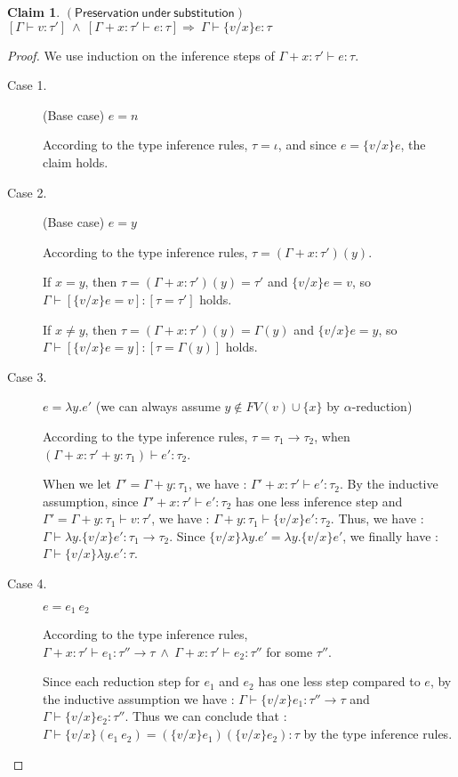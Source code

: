 \documentclass{article}
\newtheorem{clm}{Claim}[section]
\begin{document}
\begin{clm}$\mathsf{(Preservation \: under \: substitution)}$
$[\Gamma \vdash v : \tau'] \:\wedge\: [\Gamma + x : \tau' \vdash e : \tau] \Rightarrow\: \Gamma \vdash \{v/x\}e : \tau$
\end{clm}
\begin{proof}
We use induction on the inference steps of $\Gamma + x : \tau' \vdash e : \tau$.
\begin{description}

\item[Case 1.] (Base case) $e=n$

According to the type inference rules, $\tau = \iota$, and since $e=\{v/x\}e$, the claim holds.

\item[Case 2.] (Base case) $e=y$

According to the type inference rules, $\tau = (\Gamma + x : \tau')(y)$.

If $x=y$, then $\tau=(\Gamma + x : \tau')(y)=\tau'$ and $\{v/x\}e = v$, so $\Gamma \vdash [\{v/x\}e = v] : [\tau=\tau']$ holds. 

If $x \neq y$, then $\tau = (\Gamma + x : \tau')(y) = \Gamma(y)$ and $\{v/x\}e = y$, so $\Gamma \vdash [\{v/x\}e = y] : [\tau = \Gamma(y)]$ holds.

\item[Case 3.] $e = \lambda y.e'$ (we can always assume $y \notin FV(v) \cup \{x\}$ by $\alpha$-reduction)

According to the type inference rules, $\tau = \tau_1 \rightarrow \tau_2$, when $(\Gamma + x : \tau' + y : \tau_1) \vdash e' : \tau_2$.

When we let $\Gamma' = \Gamma + y : \tau_1$, we have : $\Gamma' + x : \tau' \vdash e' : \tau_2$. By the inductive assumption, since $\Gamma' + x : \tau' \vdash e' : \tau_2$ has one less inference step and $\Gamma' = \Gamma + y : \tau_1 \vdash v : \tau'$, we have : $\Gamma + y : \tau_1 \vdash \{v/x\}e' : \tau_2$. Thus, we have : $\Gamma \vdash \lambda y.\{v/x\}e' : \tau_1 \rightarrow \tau_2$. Since $\{v/x\}\lambda y.e' = \lambda y.\{v/x\}e'$, we finally have : $\Gamma \vdash \{v/x\}\lambda y.e' : \tau$.

\item[Case 4.] $e = e_1 \: e_2$

According to the type inference rules, $\Gamma + x : \tau' \vdash e_1 : \tau'' \rightarrow \tau \:\wedge\: \Gamma + x : \tau' \vdash e_2 : \tau''$ for some $\tau''$.

Since each reduction step for $e_1$ and $e_2$ has one less step compared to $e$, by the inductive assumption we have : $\Gamma \vdash \{v/x\}e_1 : \tau'' \rightarrow \tau$ and $\Gamma \vdash \{v/x\}e_2 : \tau''$. Thus we can conclude that : $\Gamma \vdash \{v/x\}(e_1 \: e_2) = (\{v/x\}e_1) (\{v/x\}e_2) : \tau$ by the type inference rules.


\end{description}
\end{proof}
\end{document}
